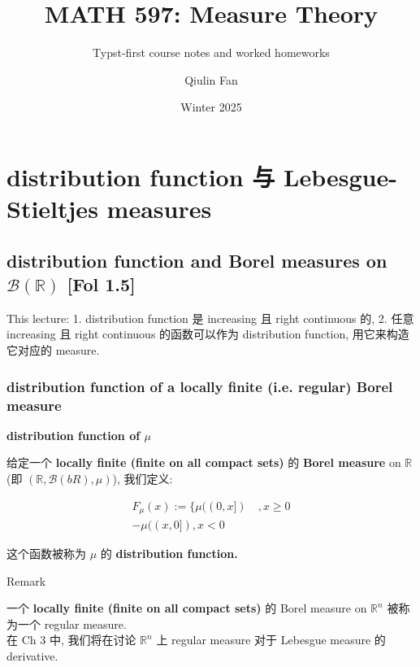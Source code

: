 \documentclass{qlnotes-export}
\title{MATH 597: Measure Theory}
\subtitle{Typst-first course notes and worked homeworks}
\author{Qiulin Fan}
\date{Winter 2025}
\begin{document}
\mainmatter
\chapter{distribution function 与 Lebesgue-Stieltjes measures}\label{distribution-function-ux4e0e-lebesgue-stieltjes-measures}

\section{\texorpdfstring{distribution function and Borel measures on \(\mathcal{B}({\mathbb{R}})\) {[}Fol 1.5{]}}{distribution function and Borel measures on \textbackslash mathcal\{B\}(\{\textbackslash mathbb\{R\}\}) {[}Fol 1.5{]}}}

This lecture: 1. distribution function 是 increasing 且 right continuous 的, 2. 任意 increasing 且 right continuous 的函数可以作为 distribution function, 用它来构造它对应的 measure.

\subsection{distribution function of a locally finite (i.e. regular) Borel measure}\label{distribution-function-of-a-locally-finite-i.e.-regular-borel-measure}

\begin{definition}{\protect{}\label{kn-distribution-function-of-mu}{\textbf{distribution
function of \(\mu\)}}}

给定一个 \textbf{locally finite (finite on all compact sets)} 的 \textbf{Borel measure} on \(\mathbb{R}\) (即 \(({\mathbb{R}},\mathcal{B}(bR),\mu)\)), 我们定义:

\[\begin{matrix}
{F_{\mu}(x) := \{\mu((0,x\rbrack)\quad,x \geq 0} \\
{- \mu((x,0\rbrack),x < 0}
\end{matrix}\]

这个函数被称为 \(\mu\) 的 \textbf{distribution function.}

\end{definition}

\begin{qlremark}{Remark}

一个 \textbf{locally finite (finite on all compact sets)} 的 Borel measure on \({\mathbb{R}}^{n}\) 被称为一个 regular measure.\\
在 Ch 3 中, 我们将在讨论 \({\mathbb{R}}^{n}\) 上 regular measure 对于 Lebesgue measure 的 derivative.

\end{qlremark}
\end{document}
